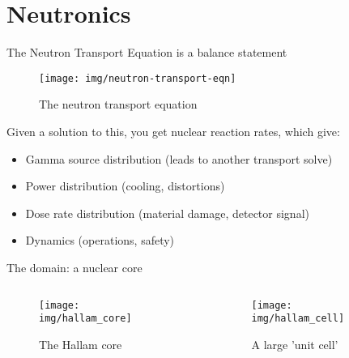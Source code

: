 \documentclass[pdf,aspectratio=169]{beamer}
\begin{document}
\section{Neutronics}
\begin{frame}{The Neutron Transport Equation is a balance statement}
    \begin{center}
        \begin{figure}[ht]
        \centering
        \texttt{[image: img/neutron-transport-eqn]}
            \caption{\tiny The neutron transport equation}
        \end{figure}
    \end{center}
    Given a solution to this, you get nuclear reaction rates, which give:
    \begin{itemize}
        \item Gamma source distribution (leads to another transport solve)
        \item Power distribution (cooling, distortions)
        \item Dose rate distribution (material damage, detector signal)
        \item Dynamics (operations, safety)
    \end{itemize}

\end{frame}

\begin{frame}{The domain: a nuclear core}
\begin{columns}
    \begin{column}{0.5\textwidth}
        \begin{figure}[ht]
        \centering
        \texttt{[image: img/hallam\_core]}
            \caption{\small The Hallam core}
        \end{figure}
    \end{column}
    \begin{column}{0.5\textwidth}
        \begin{figure}[ht]
        \centering
        \texttt{[image: img/hallam\_cell]}
        \caption{\small A large 'unit cell'}
        \end{figure}
    \end{column}
\end{columns}
\end{frame}
\end{document}
